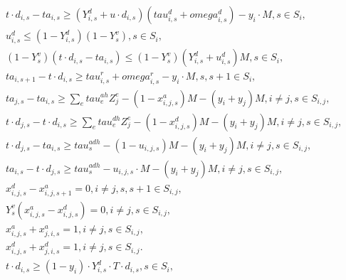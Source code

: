\begin{align}
  & t \cdot d_{i , s} - t a_{i , s} \geq \left(Y_{i , s}^{d} + u \cdot d_{i , s}\right) \left(\mathit{tau}_{i , s}^{d} + \mathit{omega}_{i , s}^{d}\right) - y_{i} \cdot M , s \in S_{i} , \tag{eq\_0001} \\
  & u_{i , s}^{d} \leq \left(1 - Y_{i , s}^{d}\right) \left(1 - Y_{s}^{v}\right) , s \in S_{i} , \tag{eq\_0002} \\
  & \left(1 - Y_{s}^{v}\right) \left(t \cdot d_{i , s} - t a_{i , s}\right) \leq \left(1 - Y_{s}^{v}\right) \left(Y_{i , s}^{d} + u_{i , s}^{d}\right) M , s \in S_{i} , \tag{eq\_0003} \\
  & t a_{i , s + 1} - t \cdot d_{i , s} \geq \mathit{tau}_{i , s}^{r} + \mathit{omega}_{i , s}^{r} - y_{i} \cdot M , s , s + 1 \in S_{i} , \tag{eq\_0004} \\
  & t a_{j , s} - t a_{i , s} \geq \sum_{e} \mathit{tau}_{e}^{a h} Z_{j}^{e} - \left(1 - x_{i , j , s}^{a}\right) M - \left(y_{i} + y_{j}\right) M , i \neq j , s \in S_{i , j} , \tag{eq\_0005} \\
  & t \cdot d_{j , s} - t \cdot d_{i , s} \geq \sum_{e} \mathit{tau}_{e}^{d h} Z_{j}^{e} - \left(1 - x_{i , j , s}^{d}\right) M - \left(y_{i} + y_{j}\right) M , i \neq j , s \in S_{i , j} , \tag{eq\_0006} \\
  & t \cdot d_{j , s} - t a_{i , s} \geq \mathit{tau}_{s}^{a d h} - \left(1 - u_{i , j , s}\right) M - \left(y_{i} + y_{j}\right) M , i \neq j , s \in S_{i , j} , \tag{eq\_0007} \\
  & t a_{i , s} - t \cdot d_{j , s} \geq \mathit{tau}_{s}^{a d h} - u_{i , j , s} \cdot M - \left(y_{i} + y_{j}\right) M , i \neq j , s \in S_{i , j} , \tag{eq\_0008} \\
  & x_{i , j , s}^{d} - x_{i , j , s + 1}^{a} = 0 , i \neq j , s , s + 1 \in S_{i , j} , \tag{eq\_0009} \\
  & Y_{s}^{v} \left(x_{i , j , s}^{a} - x_{i , j , s}^{d}\right) = 0 , i \neq j , s \in S_{i , j} , \tag{eq\_0010} \\
  & x_{i , j , s}^{a} + x_{j , i , s}^{a} = 1 , i \neq j , s \in S_{i , j} , \tag{eq\_0011} \\
  & x_{i , j , s}^{d} + x_{j , i , s}^{d} = 1 , i \neq j , s \in S_{i , j} . \tag{eq\_0012} \\
  & t \cdot d_{i , s} \geq \left(1 - y_{i}\right) \cdot Y_{i , s}^{d} \cdot T \cdot d_{i , s} , s \in S_{i} , \tag{eq\_0013} \\

\end{align}
